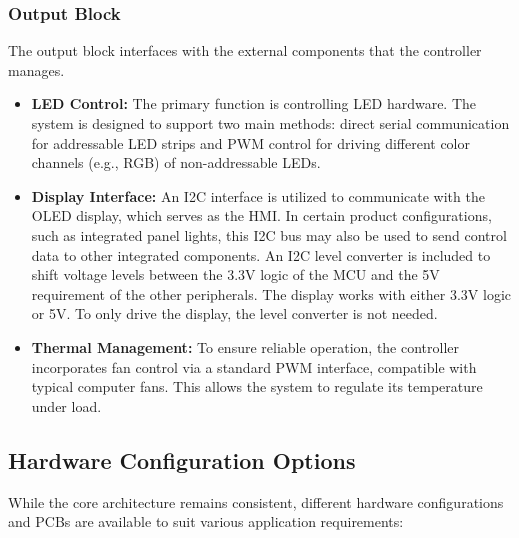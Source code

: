 \subsubsection*{Output Block}

The output block interfaces with the external components that the controller manages.

\begin{itemize}
	\item \textbf{\ac{LED} Control:} The primary function is controlling \ac{LED} hardware. The system is designed to support two main methods: direct serial communication for addressable \ac{LED} strips and \ac{PWM} control for driving different color channels (e.g., \ac{RGB}) of non-addressable \ac{LED}s.
	\item \textbf{Display Interface:} An \ac{I2C} interface is utilized to communicate with the \ac{OLED} display, which serves as the \ac{HMI}. In certain product configurations, such as integrated panel lights, this \ac{I2C} bus may also be used to send control data to other integrated components. An \ac{I2C} level converter is included to shift voltage levels between the 3.3V logic of the \ac{MCU} and the 5V requirement of the other peripherals. The display works with either 3.3V logic or 5V. To only drive the display, the level converter is not needed.
	\item \textbf{Thermal Management:} To ensure reliable operation, the controller incorporates fan control via a standard \ac{PWM} interface, compatible with typical computer fans. This allows the system to regulate its temperature under load.
\end{itemize}

\subsection{Hardware Configuration Options}
While the core architecture remains consistent, different hardware configurations and \ac{PCB}s are available to suit various application requirements:

